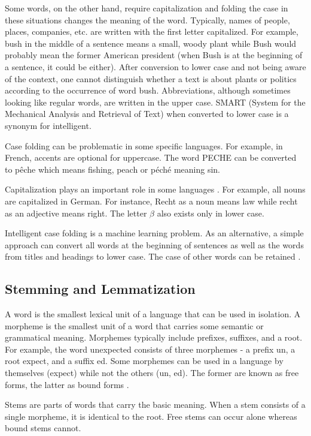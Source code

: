 \documentclass[11pt,openany,executivepaper]{book}
\begin{document}
Some words, on the other hand, require capitalization and folding the case in these situations changes the meaning of the word. Typically, names of people, places, companies, etc. are written with the first letter capitalized. For example, bush in the middle of a sentence means a small, woody plant while Bush would probably mean the former American president (when Bush is at the beginning of a sentence, it could be either). After conversion to lower case and not being aware of the context, one cannot distinguish whether a text is about plants or politics according to the occurrence of word bush. Abbreviations, although sometimes looking like regular words, are written in the upper case. SMART (System for the Mechanical Analysis and Retrieval of Text) when converted to lower case is a synonym for intelligent.

Case folding can be problematic in some specific languages. For example, in French, accents are optional for uppercase. The word PECHE can be converted to pêche which means fishing, peach or péché meaning sin.

Capitalization plays an important role in some languages \cite{102}. For example, all nouns are capitalized in German. For instance, Recht as a noun means law while recht as an adjective means right. The letter $\beta$ also exists only in lower case.

Intelligent case folding is a machine learning problem. As an alternative, a simple approach can convert all words at the beginning of sentences as well as the words from titles and headings to lower case. The case of other words can be retained \cite{6}.

\subsection{Stemming and Lemmatization}
A word is the smallest lexical unit of a language that can be used in isolation. A morpheme is the smallest unit of a word that carries some semantic or grammatical meaning. Morphemes typically include prefixes, suffixes, and a root. For example, the word unexpected consists of three morphemes - a prefix un, a root expect, and a suffix ed. Some morphemes can be used in a language by themselves (expect) while not the others (un, ed). The former are known as free forms, the latter as bound forms \cite{11}.

Stems are parts of words that carry the basic meaning. When a stem consists of a single morpheme, it is identical to the root. Free stems can occur alone whereas bound stems cannot.
\end{document}
